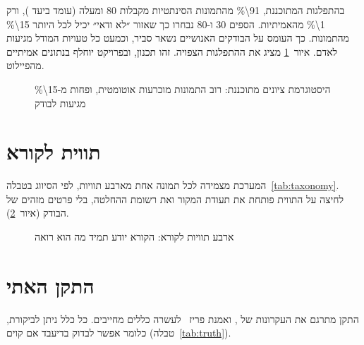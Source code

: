 בהתפלגות המתוכננת, \num{91\%} מהתמונות הסינתטיות מקבלות \num{80} ומעלה (עומד ביעד ), ורק \num{1\%} מהאמיתיות. הספים \num{30} ו-\num{80} נבחרו כך שאזור ״לא ודאי״ יכיל לכל היותר \num{15\%} מהתמונות. כך העומס על הבודקים האנושיים נשאר סביר, וכמעט כל טעויות המודל מגיעות לאדם. איור~\ref{fig:dist} מציג את ההתפלגות הצפויה. זהו תכנון, ובפרויקט יוחלף בנתונים אמיתיים מהפיילוט.

\begin{figure}[!htb]
\begin{ltrdiagram}

\end{ltrdiagram}
\caption{היסטוגרמת ציונים מתוכננת: רוב התמונות מוכרעות אוטומטית, ופחות מ-\num{15\%} מגיעות לבודק}\label{fig:dist}
\end{figure}

\section{תווית לקורא}
המערכת מצמידה לכל תמונה אחת מארבע תוויות, לפי הסיווג בטבלה~\ref{tab:taxonomy}. לחיצה על התווית פותחת את תעודת המקור ואת רשומת ההחלטה, בלי פרטים מזהים של הבודק (איור~\ref{fig:labels}).

\begin{figure}[!htb]
\begin{ltrdiagram}

\end{ltrdiagram}
\caption{ארבע תוויות לקורא: הקורא יודע תמיד מה הוא רואה}\label{fig:labels}
\end{figure}

\section{התקן האתי }\label{sec:truthimg}
התקן מתרגם את העקרונות של ,  ואמנת פריז~\cite{spj2014,ap2023,paris2023} לעשרה כללים מחייבים. כל כלל ניתן לביקורת, כלומר אפשר לבדוק בדיעבד אם קוים (טבלה~\ref{tab:truth}).

